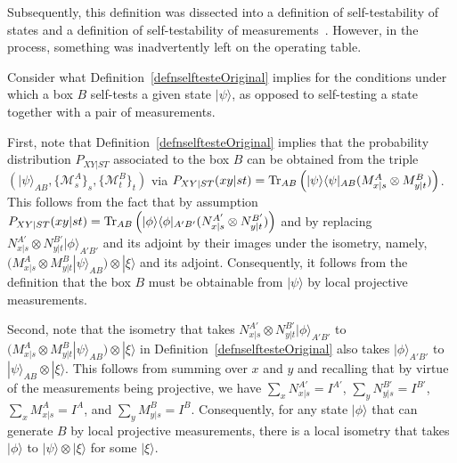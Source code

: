 \documentclass[12pt]{article}
\theoremstyle{plain}
\theoremstyle{definition}
\begin{document}
\begin{appendices}
Subsequently, this definition was dissected into a definition of self-testability of states and a definition of self-testability of measurements~\cite{ScaraniStateSelfTest2009,JedWeak2020,Coladangelo2017,vsupic2020self}.  However, in the process, something was inadvertently left  on the operating table.  

Consider what Definition~\ref{defnselftesteOriginal} implies for the conditions under which a box $B$ self-tests a given state $|\psi\rangle$, as opposed to self-testing a state together with a pair of measurements. 

First, note that Definition~\ref{defnselftesteOriginal} implies that the probability distribution $P_{XY|ST}$ associated to the box $B$ can be obtained from the triple $(|\psi\rangle_{AB}, \{ \mathcal{M}^A_s\}_s, \{\mathcal{M}^B_t\}_t)$ via $P_{XY|ST}(xy|st)= {\rm Tr}_{AB}\left(|\psi\rangle \langle \psi|_{AB} (M^{A}_{x|s} \otimes M^{B}_{y|t}) \right)$.  
This follows from the fact that by assumption $P_{XY|ST}(xy|st)= {\rm Tr}_{AB}\left(|\phi\rangle \langle \phi|_{A'B'} (N^{A'}_{x|s} \otimes N^{B'}_{y|t}) \right)$ and by replacing $N^{A'}_{x|s} \otimes N^{B'}_{y|t}|\phi\rangle_{A'B'}$ and its adjoint by their images under the isometry, namely, $\big( M^{A}_{x|s} \otimes M^{B}_{y|t} |\psi\rangle_{AB} \big) \otimes |\xi\rangle$ and its adjoint.
Consequently, it follows from the definition that the box $B$ must be obtainable from $|\psi\rangle$ by local projective measurements. 
 
Second, note that 
 the isometry that takes $N^{A'}_{x|s} \otimes N^{B'}_{y|t}|\phi\rangle_{A'B'}$ to $\big( M^{A}_{x|s} \otimes M^{B}_{y|t}|\psi\rangle_{AB} \big) \otimes |\xi\rangle$ in Definition~\ref{defnselftesteOriginal} also takes $|\phi\rangle_{A'B'}$ to $|\psi\rangle_{AB} \otimes |\xi\rangle$.  This follows from summing over $x$ and $y$ and recalling that by virtue of the measurements being projective, we have $\sum_x  N^{A'}_{x|s} =I^{A'}$, $\sum_y  N^{B'}_{y|s} =I^{B'}$, $\sum_x  M^{A}_{x|s} =I^{A}$, and $\sum_y  M^{B}_{y|s} =I^{B}$.  Consequently, for any state $|\phi\rangle$ that can generate $B$ by local projective measurements, there is a local isometry that takes $|\phi\rangle$ to $|\psi\rangle \otimes |\xi \rangle$ for some $|\xi\rangle$.  


\end{appendices}
\end{document}
